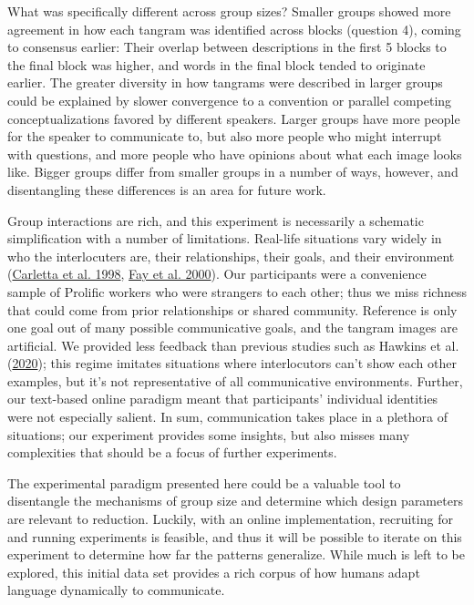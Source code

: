 \documentclass[
  english,
  a4paper,
]{article}
\begin{document}
What was specifically different across group sizes? Smaller groups showed more agreement in how each tangram was identified across blocks (question 4), coming to consensus earlier: Their overlap between descriptions in the first 5 blocks to the final block was higher, and words in the final block tended to originate earlier. The greater diversity in how tangrams were described in larger groups could be explained by slower convergence to a convention or parallel competing conceptualizations favored by different speakers. Larger groups have more people for the speaker to communicate to, but also more people who might interrupt with questions, and more people who have opinions about what each image looks like. Bigger groups differ from smaller groups in a number of ways, however, and disentangling these differences is an area for future work.

Group interactions are rich, and this experiment is necessarily a schematic simplification with a number of limitations. Real-life situations vary widely in who the interlocuters are, their relationships, their goals, and their environment (\protect\hyperlink{ref-carletta1998}{Carletta et al. 1998}, \protect\hyperlink{ref-fay2000}{Fay et al. 2000}). Our participants were a convenience sample of Prolific workers who were strangers to each other; thus we miss richness that could come from prior relationships or shared community. Reference is only one goal out of many possible communicative goals, and the tangram images are artificial.
We provided less feedback than previous studies such as Hawkins et al. (\protect\hyperlink{ref-hawkinsCharacterizingDynamicsLearning2020}{2020}); this regime imitates situations where interlocutors can't show each other examples, but it's not representative of all communicative environments. Further, our text-based online paradigm meant that participants' individual identities were not especially salient. In sum, communication takes place in a plethora of situations; our experiment provides some insights, but also misses many complexities that should be a focus of further experiments.

The experimental paradigm presented here could be a valuable tool to disentangle the mechanisms of group size and determine which design parameters are relevant to reduction. Luckily, with an online implementation, recruiting for and running experiments is feasible, and thus it will be possible to iterate on this experiment to determine how far the patterns generalize. While much is left to be explored, this initial data set provides a rich corpus of how humans adapt language dynamically to communicate.
\end{document}
